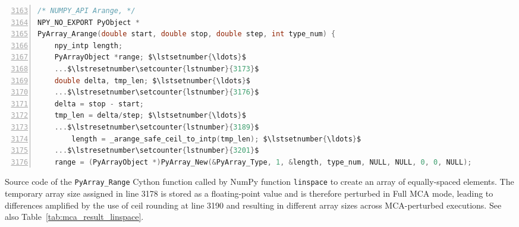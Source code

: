 \documentclass[10pt,journal,compsoc]{IEEEtran}
\begin{document}
\begin{listing}
    \begin{lstlisting}[language=C,style=customC,numbers=left, firstnumber=3163, mathescape=true]
/* NUMPY_API Arange, */
NPY_NO_EXPORT PyObject *
PyArray_Arange(double start, double stop, double step, int type_num) {
    npy_intp length; 
    PyArrayObject *range; $\lstsetnumber{\ldots}$
    ...$\lstresetnumber\setcounter{lstnumber}{3173}$
    double delta, tmp_len; $\lstsetnumber{\ldots}$
    ...$\lstresetnumber\setcounter{lstnumber}{3176}$
    delta = stop - start; 
    tmp_len = delta/step; $\lstsetnumber{\ldots}$
    ...$\lstresetnumber\setcounter{lstnumber}{3189}$
        length = _arange_safe_ceil_to_intp(tmp_len); $\lstsetnumber{\ldots}$
    ...$\lstresetnumber\setcounter{lstnumber}{3201}$
    range = (PyArrayObject *)PyArray_New(&PyArray_Type, 1, &length, type_num, NULL, NULL, 0, 0, NULL);
    \end{lstlisting}
    \caption{Source code of the \texttt{PyArray\_Range} Cython function called by NumPy function \texttt{linspace} to create an array of equally-spaced elements. The temporary array size assigned in line 3178 is stored as a floating-point value and is therefore perturbed in Full MCA mode, leading to differences amplified by the use of ceil rounding at line 3190 and resulting in different array sizes across MCA-perturbed executions. See also Table~\ref{tab:mca_result_linspace}.}
    \label{fig:pyarray_range_code}
    
\end{listing}
\end{document}
